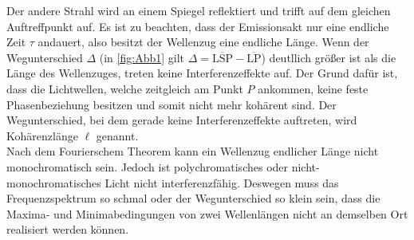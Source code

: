 Der andere Strahl wird an einem Spiegel reflektiert und trifft auf dem gleichen Auftreffpunkt auf.
Es ist zu beachten, dass der Emissionsakt nur eine endliche Zeit $\tau$ andauert, also besitzt der Wellenzug eine endliche Länge.
Wenn der Wegunterschied $\Delta$ (in \autoref{fig:Abb1} gilt $\Delta = \overline{\text{LSP}} - \overline{\text{LP}} $) deutllich größer ist 
als die Länge des Wellenzuges, treten keine Interferenzeffekte auf.
Der Grund dafür ist, dass die Lichtwellen, welche zeitgleich am Punkt $P$ ankommen, keine feste Phasenbeziehung besitzen und somit nicht
mehr kohärent sind.
Der Wegunterschied, bei dem gerade keine Interferenzeffekte auftreten, wird Kohärenzlänge $\ell$ genannt.\\
Nach dem Fourierschem Theorem kann ein Wellenzug endlicher Länge nicht monochromatisch sein.
Jedoch ist polychromatisches oder nicht-monochromatisches Licht nicht interferenzfähig.
Deswegen muss das Frequenzspektrum so schmal oder der Wegunterschied so klein sein, dass die Maxima- und Minimabedingungen von zwei Wellenlängen
nicht an demselben Ort realisiert werden können.

